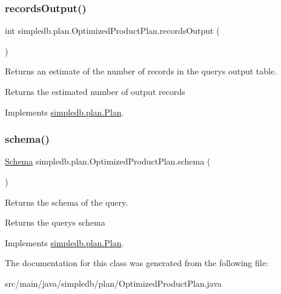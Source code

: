 \subsubsection{\texorpdfstring{records\+Output()}{recordsOutput()}}
{\footnotesize\ttfamily int simpledb.\+plan.\+Optimized\+Product\+Plan.\+records\+Output (\begin{DoxyParamCaption}{ }\end{DoxyParamCaption})\hspace{0.3cm}{\ttfamily [inline]}}

Returns an estimate of the number of records in the query\textquotesingle{}s output table. \begin{DoxyReturn}{Returns}
the estimated number of output records 
\end{DoxyReturn}


Implements \hyperlink{interfacesimpledb_1_1plan_1_1Plan_a187e06657d356c80a7f743d7ff8fd257}{simpledb.\+plan.\+Plan}.

\mbox{\label{classsimpledb_1_1plan_1_1OptimizedProductPlan_aaeadc35607f4bce16a6f57988e8737b5}} 
\subsubsection{\texorpdfstring{schema()}{schema()}}
{\footnotesize\ttfamily \hyperlink{classsimpledb_1_1record_1_1Schema}{Schema} simpledb.\+plan.\+Optimized\+Product\+Plan.\+schema (\begin{DoxyParamCaption}{ }\end{DoxyParamCaption})\hspace{0.3cm}{\ttfamily [inline]}}

Returns the schema of the query. \begin{DoxyReturn}{Returns}
the query\textquotesingle{}s schema 
\end{DoxyReturn}


Implements \hyperlink{interfacesimpledb_1_1plan_1_1Plan_ad0ee1aa2c4e7147e9f8fc6f3301fa986}{simpledb.\+plan.\+Plan}.



The documentation for this class was generated from the following file\+:\begin{DoxyCompactItemize}
\item 
src/main/java/simpledb/plan/Optimized\+Product\+Plan.\+java\end{DoxyCompactItemize}
